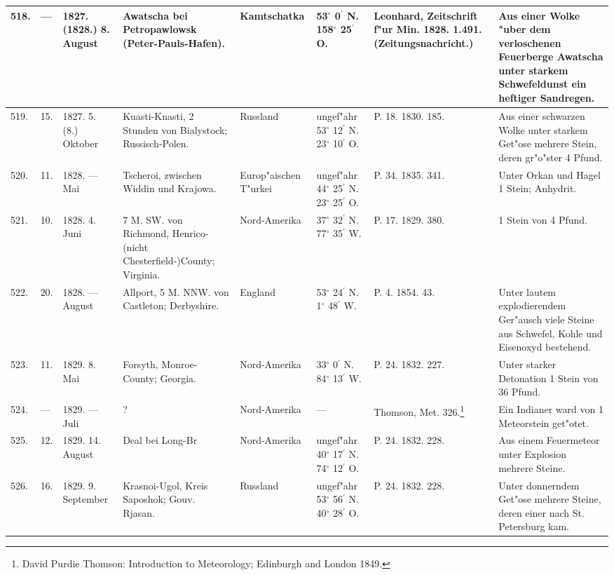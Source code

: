 \documentclass[a4paper, 8pt, oneside, polutonikogreek, german]{article}
\begin{document}
\begin{center}
\begin{longtable}{| p{5mm} | p{3mm} | p{15mm} | p{25mm} | p{20mm} | p{14mm} | p{17mm} | p{24mm} |}
        518. & --- & 1827. (1828.) 8. August & Awatscha bei Petropawlowsk (Peter-Pauls-Hafen). & Kamtschatka & 53$^\circ$ 0$^\prime$ N. 158$^\circ$ 25$^\prime$ O. & Leonhard, Zeitschrift f"ur Min. 1828. 1.491. (Zeitungsnachricht.) & Aus einer Wolke "uber dem verloschenen Feuerberge Awatscha unter starkem Schwefeldunst ein heftiger Sandregen. \\ \hline
        519. & 15. & 1827. 5. (8.) Oktober & Kuasti-Knasti, 2 Stunden von Bialystock; Russisch-Polen. & Russland & ungef"ahr 53$^\circ$ 12$^\prime$ N. 23$^\circ$ 10$^\prime$ O. & P. 18. 1830. 185. & Aus einer schwarzen Wolke unter starkem Get"ose mehrere Stein, deren gr"o"ster 4 Pfund. \\ \hline
        520. & 11. & 1828. --- Mai & Tscheroi, zwischen Widdin und Krajowa. & Europ"aischen T"urkei & ungef"ahr 44$^\circ$ 25$^\prime$ N. 23$^\circ$ 25$^\prime$ O. & P. 34. 1835. 341. & Unter Orkan und Hagel 1 Stein; Anhydrit. \\ \hline
        521. & 10. & 1828. 4. Juni & 7 M. SW. von Richmond, Henrico-(nicht Chesterfield-)County; Virginia. & Nord-Amerika & 37$^\circ$ 32$^\prime$ N. 77$^\circ$ 35$^\prime$ W. & P. 17. 1829. 380. & 1 Stein von 4 Pfund. \\ \hline
        522. & 20. & 1828. --- August & Allport, 5 M. NNW. von Castleton; Derbyshire. & England & 53$^\circ$ 24$^\prime$ N. 1$^\circ$ 48$^\prime$ W. & P. 4. 1854. 43. & Unter lautem explodierendem Ger"ausch viele Steine aus Schwefel, Kohle und Eisenoxyd bestehend. \\ \hline
        523. & 11. & 1829. 8. Mai & Forsyth, Monroe-County; Georgia. & Nord-Amerika & 33$^\circ$ 0$^\prime$ N. 84$^\circ$ 13$^\prime$ W. & P. 24. 1832. 227. & Unter starker Detonation 1 Stein von 36 Pfund. \\ \hline
        524. & --- & 1829. --- Juli & ? & Nord-Amerika & --- & Thomson, Met. 326.\footnote{David Purdie Thomson: Introduction to Meteorology; Edinburgh and London 1849.} & Ein Indianer ward von 1 Meteorstein get"otet. \\ \hline
        525. & 12. & 1829. 14. August & Deal bei Long-Br & Nord-Amerika & ungef"ahr 40$^\circ$ 17$^\prime$ N. 74$^\circ$ 12$^\prime$ O. & P. 24. 1832. 228. & Aus einem Feuermeteor unter Explosion mehrere Steine. \\ \hline
        526. & 16. & 1829. 9. September & Krasnoi-Ugol, Kreis Saposhok; Gouv. Rjasan. & Russland & ungef"ahr 53$^\circ$ 56$^\prime$ N. 40$^\circ$ 28$^\prime$ O. & P. 24. 1832. 228. & Unter donnerndem Get"ose mehrere Steine, deren einer nach St. Petersburg kam. \\ \hline

\end{longtable}
\end{center}
\end{document}
